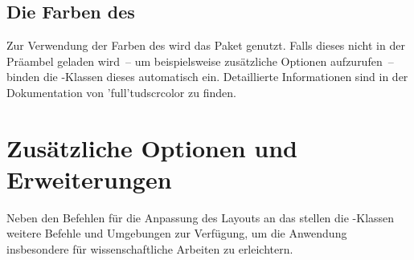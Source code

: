 \begin{DeclareEntity*}{}
\begin{DeclareEntity*}{}
\begin{DeclareEntity*}{}
\subsection{%
  Die Farben des \CDs%
}
%
Zur Verwendung der Farben des \CDs wird das Paket  
genutzt. Falls dieses nicht in der Präambel geladen wird~-- um beispielsweise 
zusätzliche Optionen aufzurufen~-- binden die \TUDScript-Klassen dieses 
automatisch ein. Detaillierte Informationen sind in der Dokumentation von 
\Package'full'{tudscrcolor} zu finden.%
%



\section{Zusätzliche Optionen und Erweiterungen}
%
%
Neben den Befehlen für die Anpassung des Layouts an das \TUDCD stellen die 
\TUDScript-Klassen weitere Befehle und Umgebungen zur Verfügung, um die 
Anwendung insbesondere für wissenschaftliche Arbeiten zu erleichtern.




\end{DeclareEntity*}
\end{DeclareEntity*}
\end{DeclareEntity*}

